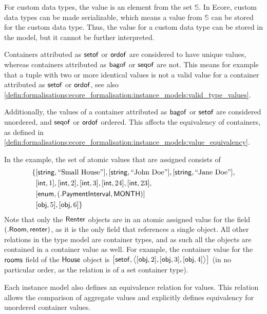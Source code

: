 For custom data types, the value is an element from the set $\mathbb{S}$. In Ecore, custom data types can be made serializable, which means a value from $\mathbb{S}$ can be stored for the custom data type. Thus, the value for a custom data type can be stored in the model, but it cannot be further interpreted.

Containers attributed as $\mathsf{setof}$ or $\mathsf{ordof}$ are considered to have unique values, whereas containers attributed as $\mathsf{bagof}$ or $\mathsf{seqof}$ are not. This means for example that a tuple with two or more identical values is not a valid value for a container attributed as $\mathsf{setof}$ or $\mathsf{ordof}$, see also \cref{defin:formalisations:ecore_formalisation:instance_models:valid_type_values}.

Additionally, the values of a container attributed as $\mathsf{bagof}$ or $\mathsf{setof}$ are considered unordered, and $\mathsf{seqof}$ or $\mathsf{ordof}$ ordered. This affects the equivalency of containers, as defined in \cref{defin:formalisations:ecore_formalisation:instance_models:value_equivalency}.

In the example, the set of atomic values that are assigned consists of
\begin{align*}
    \{&
        [ \mathsf{string}, \text{``Small House''} ], 
        [ \mathsf{string}, \text{``John Doe''} ], 
        [ \mathsf{string}, \text{``Jane Doe''} ],\\&
        [ \mathsf{int}, 1 ], 
        [ \mathsf{int}, 2 ], 
        [ \mathsf{int}, 3 ], 
        [ \mathsf{int}, 24 ], 
        [ \mathsf{int}, 23 ],\\&
        [ \mathsf{enum}, ( .\mathsf{PaymentInterval}, \mathsf{MONTH} ) ]\\&
        [ \mathsf{obj}, 5 ],
        [ \mathsf{obj}, 6 ]
    \}
\end{align*}
Note that only the $\mathsf{Renter}$ objects are in an atomic assigned value for the field $(.\mathsf{Room}, \mathsf{renter})$, as it is the only field that references a single object. All other relations in the type model are container types, and as such all the objects are contained in a container value as well. For example, the container value for the $\mathsf{rooms}$ field of the $\mathsf{House}$ object is $\big[ \mathsf{setof}, \big\langle [ \mathsf{obj}, 2 ], [ \mathsf{obj}, 3 ], [ \mathsf{obj}, 4 ] \big\rangle \big]$ (in no particular order, as the relation is of a set container type).

Each instance model also defines an equivalence relation for values. This relation allows the comparison of aggregate values and explicitly defines equivalency for unordered container values.


